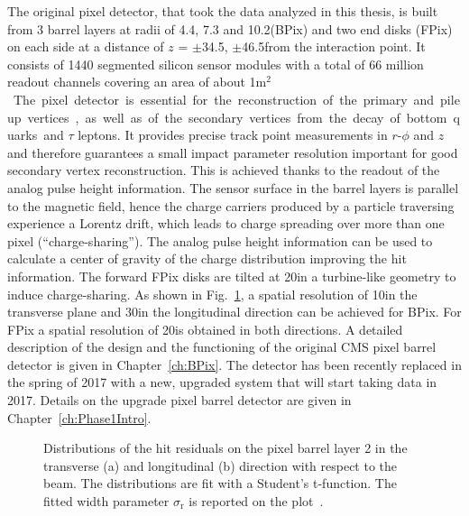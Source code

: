 The original pixel detector, that took the data analyzed in this thesis, is built from 3 barrel layers at radii of 4.4, 7.3 and 10.2\cm (BPix) and two end disks (FPix) on each side at a distance of $z$ = $\pm$34.5, $\pm$46.5\cm from the interaction point. It consists of 1440 segmented silicon sensor modules with a total of 66 million readout channels covering an area of about 1\unit{m$^2$}. The pixel detector is essential for the reconstruction of the primary and pileup vertices, as well as of the secondary vertices from the decay of bottom quarks and $\tau$ leptons. It provides precise track point measurements in $r$-$\phi$ and $z$ and therefore guarantees a small impact parameter resolution important for good secondary vertex reconstruction. This is achieved thanks to the readout of the analog pulse height information. The sensor surface in the barrel layers is parallel to the magnetic field, hence the charge carriers produced by a particle traversing experience a Lorentz drift, which leads to charge spreading over more than one pixel (``charge-sharing''). The analog pulse height information can be used to calculate a center of gravity of the charge distribution improving the hit information. The forward FPix disks are tilted at 20\de in a turbine-like geometry to induce charge-sharing. As shown in Fig.~\ref{fig:pxRes}, a spatial resolution of 10\mum in the transverse plane and 30\mum in the longitudinal direction can be achieved for BPix. For FPix a spatial resolution of 20\mum is obtained in both directions. %
A detailed description of the design and the functioning of the original CMS pixel barrel detector is given in Chapter~\ref{ch:BPix}.
The detector has been recently replaced in the spring of 2017 with a new, upgraded system that will start taking data in 2017. Details on the upgrade pixel barrel detector are given in Chapter~\ref{ch:Phase1Intro}.\\

\begin{figure}[h]
 \begin{center}
 \end{center}
 \caption{Distributions of the hit residuals on the pixel barrel layer 2 in the transverse (a) and longitudinal (b) direction with respect to the beam. The distributions are fit with a Student's t-function. The fitted width parameter $\sigma_\mathrm{r}$ is reported on the plot~\cite{PixelOffline}.}
 \label{fig:pxRes}
\end{figure}

